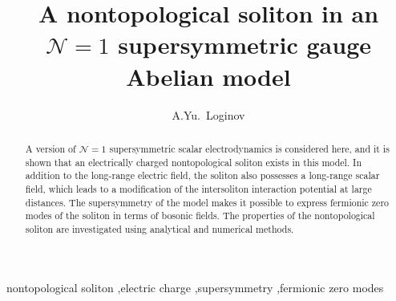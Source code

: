 


\begin{frontmatter}




\title{A nontopological soliton in an $\mathcal{N} = 1$ supersymmetric gauge
       Abelian model}

\author[tusur]{A.Yu.~Loginov}

\address[tusur]{Laboratory of Applied Mathematics and Theoretical Physics, Tomsk State
                University of Control Systems and Radioelectronics, 634050 Tomsk, Russia}

\begin{abstract}
A version of  $\mathcal{N}  =  1$   supersymmetric   scalar  electrodynamics is
considered here, and it is shown that  an  electrically  charged nontopological
soliton  exists in this model.
In addition  to  the  long-range  electric  field, the soliton also possesses a
long-range  scalar  field,  which leads to a modification  of  the intersoliton
interaction potential at large distances.
The supersymmetry of the model  makes  it  possible  to  express fermionic zero
modes of the soliton in terms of bosonic fields.
The properties of the nontopological soliton  are investigated using analytical
and numerical methods.
\end{abstract}

\begin{keyword}
nontopological soliton \sep electric charge \sep supersymmetry \sep fermionic zero modes



\end{keyword}

\end{frontmatter}

